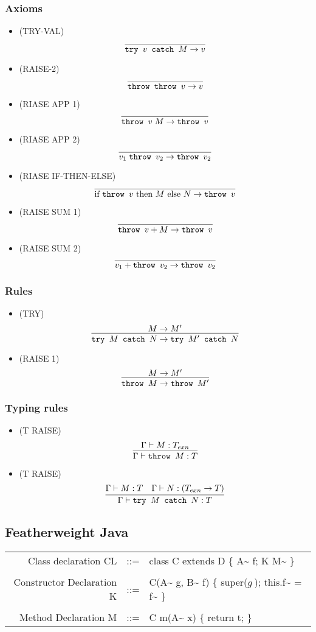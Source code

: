 \documentclass[11pt]{article}
\newcommand{\ifc}[3]{\ensuremath{\text{if } #1 \text{ then } #2 \text{ else } #3}}
\newcommand{\app}[2]{\ensuremath{ #1 \; #2}}
\newcommand{\type}[2]{\ensuremath{ #1 : #2 }}
\newcommand{\throw}[1]{\ensuremath{\texttt{throw } #1}}
\newcommand{\tc}[2]{\ensuremath{\texttt{try } #1 \texttt{ catch } #2}}
\begin{document}
\subsubsection*{Axioms}
\label{sec:org95db2da}
\begin{itemize}
\item (TRY-VAL) \[\infer{\tc{v}{M}\to v}{}\]
\item (RAISE-2) \[\infer{\throw{\throw{v}} \to v}{}\]
\item (RIASE APP 1) \[\infer{\app{\throw{v}}{M} \to \throw{v}}{}\]
\item (RIASE APP 2) \[\infer{\app{v_1}{\throw{v_2}} \to
      \throw{v_2}}{}\]
\item (RIASE IF-THEN-ELSE) \[\infer{\ifc{\throw{v}}{M}{N}\to
      \throw{v}}{}\]
\item (RAISE SUM 1) \[\infer{\throw{v} + M \to \throw{v}}{}\]
\item (RAISE SUM 2) \[\infer{v_1 + \throw{v_2} \to \throw{v_2}}{}\]
\end{itemize}
\subsubsection*{Rules}
\label{sec:org4bc0b88}
\begin{itemize}
\item (TRY) \[\infer{\tc{M}{N} \to \tc{M'}{N}}{M\to M'}\]
\item (RAISE 1) \[\infer{\throw{M} \to \throw{M'}}{M\to M'}\]
\end{itemize}
\subsubsection*{Typing rules}
\label{sec:org568c11d}
\begin{itemize}
\item (T RAISE) \[\infer{\Gamma\vdash \type{\throw{M}}{T}}
      {\Gamma\vdash \type{M}{T_{exn}}}\]
\item (T RAISE)
\[\infer{\Gamma\vdash\type{\tc{M}{N}}{T}}{\Gamma\vdash\type{M}{T}
      & \Gamma\vdash \type{N}{(T_{exn}\to T)}}\]
\end{itemize}
\subsection*{Featherweight Java}
\label{sec:orgb3c980b}
\begin{center}
\begin{tabular}{rcl}
Class declaration CL & ::= & class C extends D \{ A\textasciitilde{} f; K M\textasciitilde{} \}\\
 &  & \\
Constructor Declaration K & ::= & C(A\textasciitilde{} g, B\textasciitilde{} f) \{ super(\(g~\)); this.f\textasciitilde{} = f\textasciitilde{} \}\\
 &  & \\
Method Declaration M & ::= & C m(A\textasciitilde{} x) \{ return t; \}\\
\end{tabular}

\end{center}
\end{document}
